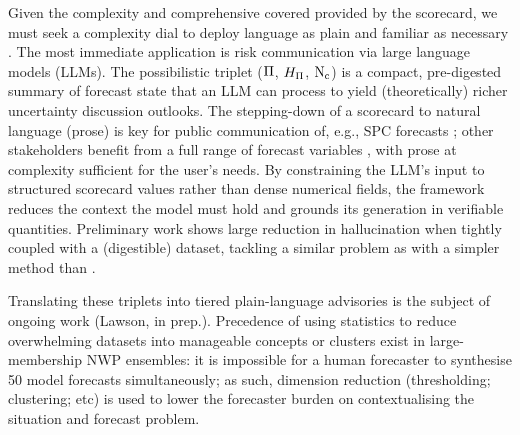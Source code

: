 Given the complexity and comprehensive covered
provided by the scorecard,
we must seek a complexity dial to deploy language
as plain and familiar as
necessary \citep{Gigerenzer2005-zs,Joslyn2009-rg}.
The most immediate application is risk
communication via large language models (LLMs).
The possibilistic triplet ($\Pi$, $H_{\Pi}$, $\mathrm{N}_{\mathrm{c}}$) is
a compact, pre-digested summary of forecast state
that an LLM can process to yield (theoretically)
richer uncertainty discussion outlooks.
The stepping-down of a scorecard to natural language
(prose) is key for public communication of,
e.g., SPC forecasts \citep{Krocak2022-sy};
other stakeholders benefit from a full range of
forecast variables \citep{McGovern2017-kf,Le_Carrer2021-ke},
with prose at complexity sufficient for the
user's needs.
By constraining the LLM's input to structured
scorecard
values rather than dense numerical fields, the framework reduces the
context the model must hold and grounds its generation in
verifiable quantities.
Preliminary work shows large reduction in
hallucination \citep{Jardine1997-tn} when tightly
coupled with a (digestible) dataset,
tackling a similar problem
as \citet{Chen2023-ax} with a simpler method
than \citep{Jin2023-cv}.

Translating these triplets into tiered plain-language advisories is the
subject of ongoing work (Lawson, in prep.).
Precedence of using statistics to reduce
overwhelming datasets into manageable concepts or
clusters exist in large-membership NWP ensembles:
it is impossible for a human forecaster to
synthesise 50 model forecasts simultaneously;
as such, dimension reduction (thresholding;
clustering; etc) is used to lower the forecaster
burden on contextualising the situation and
forecast problem.
